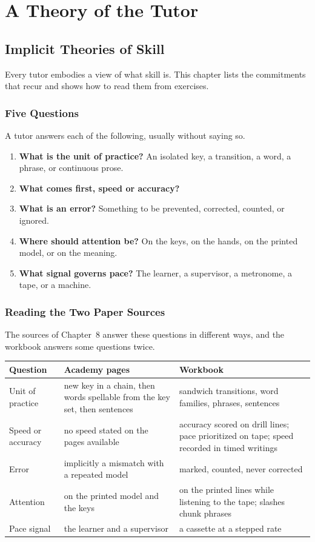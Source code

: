 \part{A Theory of the Tutor}

\chapter{Implicit Theories of Skill}

Every tutor embodies a view of what skill is. This chapter lists the commitments that recur and shows how to read them from exercises.

\section{Five Questions}

A tutor answers each of the following, usually without saying so.

\begin{enumerate}
\item \textbf{What is the unit of practice?} An isolated key, a transition, a word, a phrase, or continuous prose.
\item \textbf{What comes first, speed or accuracy?}
\item \textbf{What is an error?} Something to be prevented, corrected, counted, or ignored.
\item \textbf{Where should attention be?} On the keys, on the hands, on the printed model, or on the meaning.
\item \textbf{What signal governs pace?} The learner, a supervisor, a metronome, a tape, or a machine.
\end{enumerate}

\section{Reading the Two Paper Sources}

The sources of Chapter~8 answer these questions in different ways, and the workbook answers some questions twice.

\begin{center}
\begin{tabular}{@{}p{3.1cm}p{4.2cm}p{4.6cm}@{}}
\toprule
Question & Academy pages & Workbook \\
\midrule
Unit of practice & new key in a chain, then words spellable from the key set, then sentences & sandwich transitions, word families, phrases, sentences \\
Speed or accuracy & no speed stated on the pages available & accuracy scored on drill lines; pace prioritized on tape; speed recorded in timed writings \\
Error & implicitly a mismatch with a repeated model & marked, counted, never corrected \\
Attention & on the printed model and the keys & on the printed lines while listening to the tape; slashes chunk phrases \\
Pace signal & the learner and a supervisor & a cassette at a stepped rate \\
\bottomrule
\end{tabular}
\end{center}

